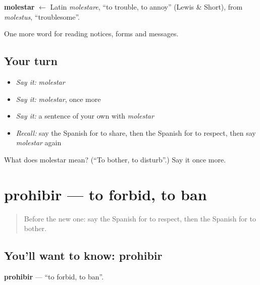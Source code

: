 \begin{cousinweb}
\textbf{molestar} $\leftarrow$ Latin \emph{molestare}, \textquotedblleft{}to trouble, to annoy\textquotedblright{} (Lewis \& Short), from \emph{molestus}, \textquotedblleft{}troublesome\textquotedblright{}.
\end{cousinweb}

\begin{grammarlens}[title={What you've built}]
One more word for reading notices, forms and messages.
\end{grammarlens}

\subsection*{Your turn}
\begin{itemize}
\raggedright
  \item \emph{Say it:} \emph{molestar}
  \item \emph{Say it:} \emph{molestar}, once more
  \item \emph{Say it:} a sentence of your own with \emph{molestar}
  \item \emph{Recall:} say the Spanish for to share, then the Spanish for to respect, then say \emph{molestar} again
\end{itemize}

\begin{tcolorbox}[breakable,colback=teal!4,colframe=teal!35!black,title={Before you move on}]
What does molestar mean? (\textquotedblleft{}To bother, to disturb\textquotedblright{}.) Say it once more.
\end{tcolorbox}
\section[prohibir]{prohibir — to forbid, to ban}

\label{lesson:ES-C500-prohibir}



\begin{quote}
Before the new one: say the Spanish for to respect, then the Spanish for to bother.
\end{quote}

\subsection*{You'll want to know: prohibir}
\textbf{prohibir} — \textquotedblleft{}to forbid, to ban\textquotedblright{}.

